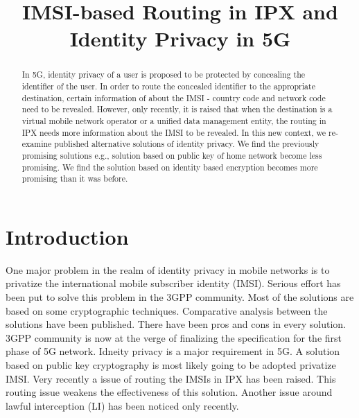 \documentclass[conference]{IEEEtran}
\begin{document}
\title{IMSI-based Routing in IPX and Identity Privacy in 5G}
\date{}%

\author{
\and
{}
}
\maketitle

\begin{abstract}
In 5G, identity privacy of a user is proposed to be protected by concealing the identifier of the user. In order to route the concealed identifier to the appropriate destination, certain information of about the IMSI - country code and network code need to be revealed. However, only recently, it is raised that when the destination is a virtual mobile network operator or a unified data management entity, the routing in IPX needs more information about the IMSI to be revealed. In this new context, we re-examine published alternative solutions of identity privacy. We find the previously promising solutions e.g., solution based on public key of home network become less promising. We find the solution based on identity based encryption becomes more promising than it was before.
\end{abstract}

\section{Introduction} \label{intro}
One major problem in the realm of identity privacy in mobile networks is to privatize the international mobile subscriber identity (IMSI). Serious effort has been put to solve this problem in the 3GPP community. Most of the solutions are based on some cryptographic techniques. Comparative analysis between the solutions have been published. There have been pros and cons in every solution. 
3GPP community is now at the verge of finalizing the specification for the first phase of 5G network. Idneity privacy is a major requirement in 5G. A solution based on public key cryptography is most likely going to be adopted privatize IMSI. Very recently a issue of routing the IMSIs in IPX has been raised. This routing issue weakens the effectiveness of this solution. Another issue around lawful interception (LI) has been noticed only recently.
\end{document}
